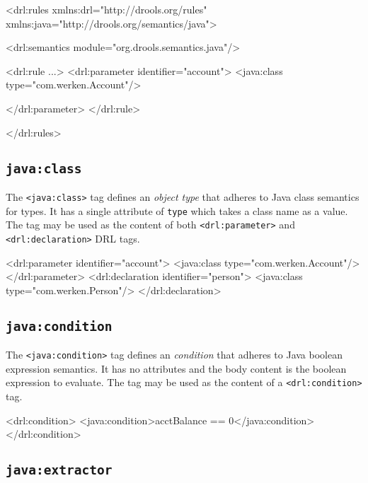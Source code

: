 \begin{codelisting}
\textcolor{light}{<drl:rules xmlns:drl="http://drools.org/rules"}
       xmlns:java="http://drools.org/semantics/java"\textcolor{light}{>}

  <drl:semantics module="org.drools.semantics.java"/>

  \textcolor{light}{<drl:rule ...>
    <drl:parameter identifier="account">}
      <java:class type="com.werken.Account"/>
    \textcolor{light}{</drl:parameter>
  </drl:rule>

</drl:rules>}
\end{codelisting}


\subsection{\texttt{java:class}}

The \verb|<java:class>| tag defines an \emph{object type} that adheres
to Java class semantics for types.  It has a single attribute of
\verb|type| which takes a class name as a value.  The tag may be
used as the content of both \verb|<drl:parameter>| and
\verb|<drl:declaration>| DRL tags.

\begin{codelisting}
\textcolor{light}{<drl:parameter identifier="account">}
  <java:class type="com.werken.Account"/>
\textcolor{light}{</drl:parameter>
<drl:declaration identifier="person">}
  <java:class type="com.werken.Person"/>
\textcolor{light}{</drl:declaration>}
\end{codelisting}

\subsection{\texttt{java:condition}}

The \verb|<java:condition>| tag defines an \emph{condition} that
adheres to Java boolean expression semantics.  It has no
attributes and the body content is the boolean expression to
evaluate.  The tag may be used as the content of a \verb|<drl:condition>|
tag.

\begin{codelisting}
\textcolor{light}{<drl:condition>}
  <java:condition>acctBalance == 0</java:condition>
\textcolor{light}{</drl:condition>}
\end{codelisting}

\subsection{\texttt{java:extractor}}

